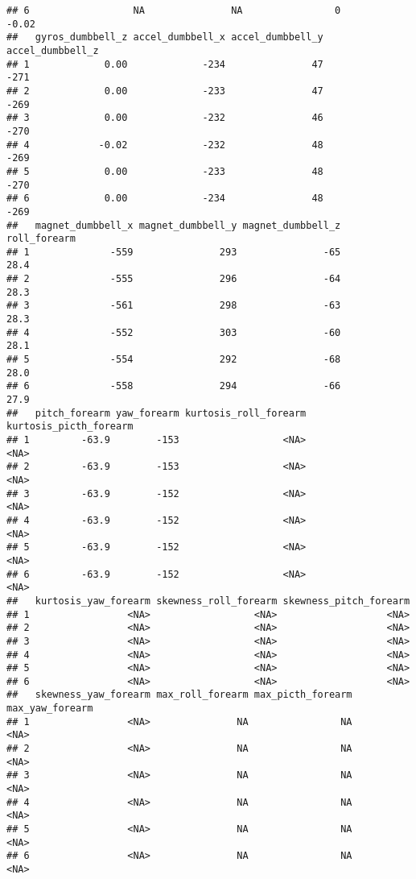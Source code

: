 \documentclass[
]{article}
\begin{document}
\begin{verbatim}
## 6                  NA               NA                0            -0.02
##   gyros_dumbbell_z accel_dumbbell_x accel_dumbbell_y accel_dumbbell_z
## 1             0.00             -234               47             -271
## 2             0.00             -233               47             -269
## 3             0.00             -232               46             -270
## 4            -0.02             -232               48             -269
## 5             0.00             -233               48             -270
## 6             0.00             -234               48             -269
##   magnet_dumbbell_x magnet_dumbbell_y magnet_dumbbell_z roll_forearm
## 1              -559               293               -65         28.4
## 2              -555               296               -64         28.3
## 3              -561               298               -63         28.3
## 4              -552               303               -60         28.1
## 5              -554               292               -68         28.0
## 6              -558               294               -66         27.9
##   pitch_forearm yaw_forearm kurtosis_roll_forearm kurtosis_picth_forearm
## 1         -63.9        -153                  <NA>                   <NA>
## 2         -63.9        -153                  <NA>                   <NA>
## 3         -63.9        -152                  <NA>                   <NA>
## 4         -63.9        -152                  <NA>                   <NA>
## 5         -63.9        -152                  <NA>                   <NA>
## 6         -63.9        -152                  <NA>                   <NA>
##   kurtosis_yaw_forearm skewness_roll_forearm skewness_pitch_forearm
## 1                 <NA>                  <NA>                   <NA>
## 2                 <NA>                  <NA>                   <NA>
## 3                 <NA>                  <NA>                   <NA>
## 4                 <NA>                  <NA>                   <NA>
## 5                 <NA>                  <NA>                   <NA>
## 6                 <NA>                  <NA>                   <NA>
##   skewness_yaw_forearm max_roll_forearm max_picth_forearm max_yaw_forearm
## 1                 <NA>               NA                NA            <NA>
## 2                 <NA>               NA                NA            <NA>
## 3                 <NA>               NA                NA            <NA>
## 4                 <NA>               NA                NA            <NA>
## 5                 <NA>               NA                NA            <NA>
## 6                 <NA>               NA                NA            <NA>

\end{verbatim}
\end{document}
